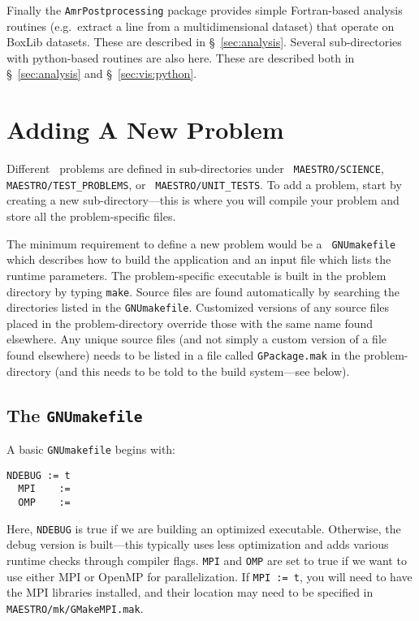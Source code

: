 Finally the {\tt AmrPostprocessing} package provides simple
Fortran-based analysis routines (e.g.\ extract a line from a
multidimensional dataset) that operate on BoxLib datasets.  These are
described in \S~\ref{sec:analysis}.  Several sub-directories with
python-based routines are also here.  These are described both in
\S~\ref{sec:analysis} and \S~\ref{sec:vis:python}.





\section{Adding A New Problem}
\label{sec:adding_problems}

Different \maestro\ problems are defined in sub-directories under {\tt
  MAESTRO/SCIENCE}, {\tt MAESTRO/TEST\_PROBLEMS}, or {\tt
  MAESTRO/UNIT\_TESTS}.  To add a problem, start by creating a new
sub-directory---this is where you will compile your problem and store
all the problem-specific files.

The minimum requirement to define a new problem would be a {\tt
  GNUmakefile} which describes how to build the application and an
input file which lists the runtime parameters.  The problem-specific
executable is built in the problem directory by typing {\tt make}.
Source files are found automatically by searching the directories
listed in the {\tt GNUmakefile}.  Customized versions of any source
files placed in the problem-directory override those with the same
name found elsewhere.  Any unique source files (and not simply a
custom version of a file found elsewhere) needs to be listed in a file
called {\tt GPackage.mak} in the problem-directory (and this needs to
be told to the build system---see below).

\subsection{The {\tt GNUmakefile}}

\label{sec:makefile}

A basic {\tt GNUmakefile} begins with:
\begin{lstlisting}[language={[gnu]make},mathescape=false]
  NDEBUG := t
  MPI    :=
  OMP    :=
\end{lstlisting}
Here, {\tt NDEBUG} is true if we are building an optimized executable.
Otherwise, the debug version is built---this typically uses less
optimization and adds various runtime checks through compiler flags.
{\tt MPI} and {\tt OMP} are set to true if we want to use either MPI
or OpenMP for parallelization.  If {\tt MPI := t}, you will need to
have the MPI libraries installed, and their location may need to be 
specified in {\tt MAESTRO/mk/GMakeMPI.mak}.

